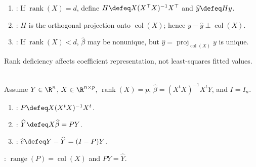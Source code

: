 \begin{method} \label{meth:sl-linear-regression-projection-and-rank} 
\begin{enumerate}[label=(\roman*)]
\setlength{\itemsep}{0pt}
\item {}: If $\operatorname{rank}(X)=d$, define $H\defeq X(X^\top X)^{-1}X^\top$ and $\widehat{y}\defeq Hy$.
\item {}: $H$ is the orthogonal projection onto $\operatorname{col}(X)$; hence $y-\widehat{y}\perp\operatorname{col}(X)$.
\item {}: If $\operatorname{rank}(X)<d$, $\widehat{\beta}$ may be nonunique, but $\widehat{y}=\operatorname{proj}_{\operatorname{col}(X)}y$ is unique.
\end{enumerate}
Rank deficiency affects coefficient representation, not least-squares fitted values.
\end{method}

\begin{definition} \label{def:hat-matrix-fitted-values-and-residuals} \\
Assume $Y\in\R^n$, $X\in\R^{n\times p}$, $\operatorname{rank}(X)=p$, $\widehat{\beta}=(X^tX)^{-1}X^tY$, and $I=I_n$.
\begin{enumerate}[label=(\roman*)]
\setlength{\itemsep}{0pt}
\item {}: $P\defeq X(X^tX)^{-1}X^t$.
\item {}: $\widehat{Y}\defeq X\widehat{\beta}=PY$.
\item {}: $\widehat{e}\defeq Y-\widehat{Y}=(I-P)Y$.
\end{enumerate}
: $\operatorname{range}(P)=\operatorname{col}(X)$ and $PY=\widehat{Y}$.
\end{definition}

